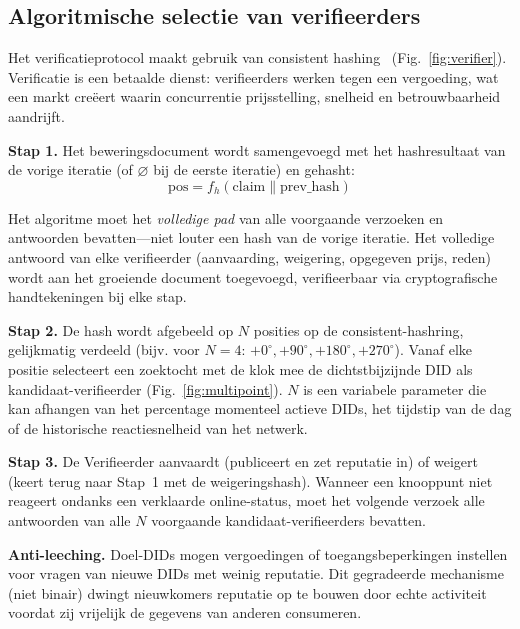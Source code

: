 \documentclass[11pt,a4paper,twocolumn]{article}
\begin{document}
\subsection{Algoritmische selectie van verifieerders}

Het verificatieprotocol maakt gebruik van consistent hashing~\cite{karger1997} (Fig.~\ref{fig:verifier}). Verificatie is een betaalde dienst: verifieerders werken tegen een vergoeding, wat een markt creëert waarin concurrentie prijsstelling, snelheid en betrouwbaarheid aandrijft.

\textbf{Stap 1.} Het beweringsdocument wordt samengevoegd met het hashresultaat van de vorige iteratie (of $\varnothing$ bij de eerste iteratie) en gehasht:
\begin{equation}
\text{pos} = f_h(\text{claim} \| \text{prev\_hash})
\label{eq:hash}
\end{equation}

Het algoritme moet het \emph{volledige pad} van alle voorgaande verzoeken en antwoorden bevatten---niet louter een hash van de vorige iteratie. Het volledige antwoord van elke verifieerder (aanvaarding, weigering, opgegeven prijs, reden) wordt aan het groeiende document toegevoegd, verifieerbaar via cryptografische handtekeningen bij elke stap.

\textbf{Stap 2.} De hash wordt afgebeeld op $N$ posities op de consistent-hashring, gelijkmatig verdeeld (bijv. voor $N=4$: $+0^{\circ}, +90^{\circ}, +180^{\circ}, +270^{\circ}$). Vanaf elke positie selecteert een zoektocht met de klok mee de dichtstbijzijnde DID als kandidaat-verifieerder (Fig.~\ref{fig:multipoint}). $N$ is een variabele parameter die kan afhangen van het percentage momenteel actieve DIDs, het tijdstip van de dag of de historische reactiesnelheid van het netwerk.

\textbf{Stap 3.} De Verifieerder aanvaardt (publiceert en zet reputatie in) of weigert (keert terug naar Stap~1 met de weigeringshash). Wanneer een knooppunt niet reageert ondanks een verklaarde online-status, moet het volgende verzoek alle antwoorden van alle $N$ voorgaande kandidaat-verifieerders bevatten.

\textbf{Anti-leeching.} Doel-DIDs mogen vergoedingen of toegangsbeperkingen instellen voor vragen van nieuwe DIDs met weinig reputatie. Dit gegradeerde mechanisme (niet binair) dwingt nieuwkomers reputatie op te bouwen door echte activiteit voordat zij vrijelijk de gegevens van anderen consumeren.
\end{document}
